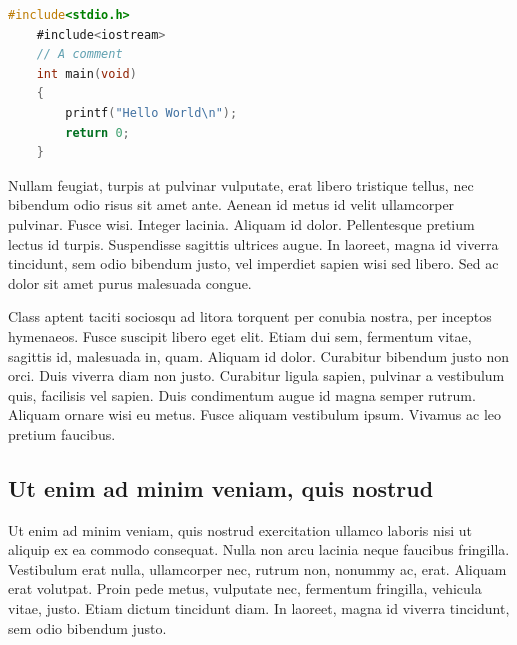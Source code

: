 \begin{lstlisting}[caption={Zbytečný kód},label=list:8-6,captionpos=b,float,abovecaptionskip=-\medskipamount,abovecaptionskip=\medskipamount,language=C]
    #include<stdio.h>
    #include<iostream>
    // A comment
    int main(void)
    {
        printf("Hello World\n");
        return 0;
    }
\end{lstlisting}

Nullam feugiat, turpis at pulvinar vulputate, erat libero tristique tellus, nec bibendum odio risus sit amet ante. Aenean id metus id velit ullamcorper pulvinar. Fusce wisi. Integer lacinia. Aliquam id dolor. Pellentesque pretium lectus id turpis. Suspendisse sagittis ultrices augue. In laoreet, magna id viverra tincidunt, sem odio bibendum justo, vel imperdiet sapien wisi sed libero. Sed ac dolor sit amet purus malesuada congue.~\cite{Crochemore2002}

Class aptent taciti sociosqu ad litora torquent per conubia nostra, per inceptos hymenaeos. Fusce suscipit libero eget elit. Etiam dui sem, fermentum vitae, sagittis id, malesuada in, quam. Aliquam id dolor. Curabitur bibendum justo non orci. Duis viverra diam non justo. Curabitur ligula sapien, pulvinar a vestibulum quis, facilisis vel sapien. Duis condimentum augue id magna semper rutrum. Aliquam ornare wisi eu metus. Fusce aliquam vestibulum ipsum. Vivamus ac leo pretium faucibus.~\cite{Motwani2014}

\subsection{Ut enim ad minim veniam, quis nostrud}

Ut enim ad minim veniam, quis nostrud exercitation ullamco laboris nisi ut aliquip ex ea commodo consequat. Nulla non arcu lacinia neque faucibus fringilla. Vestibulum erat nulla, ullamcorper nec, rutrum non, nonummy ac, erat. Aliquam erat volutpat. Proin pede metus, vulputate nec, fermentum fringilla, vehicula vitae, justo. Etiam dictum tincidunt diam. In laoreet, magna id viverra tincidunt, sem odio bibendum justo.~\cite{Sestakova2018}

